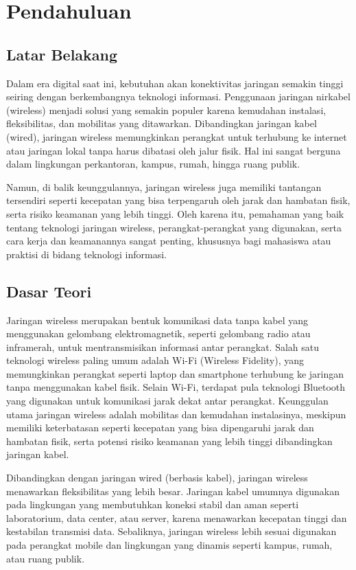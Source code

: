 \section{Pendahuluan}
\subsection{Latar Belakang}
Dalam era digital saat ini, kebutuhan akan konektivitas jaringan semakin tinggi seiring dengan berkembangnya teknologi informasi. Penggunaan jaringan nirkabel (wireless) menjadi solusi yang semakin populer karena kemudahan instalasi, fleksibilitas, dan mobilitas yang ditawarkan. Dibandingkan jaringan kabel (wired), jaringan wireless memungkinkan perangkat untuk terhubung ke internet atau jaringan lokal tanpa harus dibatasi oleh jalur fisik. Hal ini sangat berguna dalam lingkungan perkantoran, kampus, rumah, hingga ruang publik.

Namun, di balik keunggulannya, jaringan wireless juga memiliki tantangan tersendiri seperti kecepatan yang bisa terpengaruh oleh jarak dan hambatan fisik, serta risiko keamanan yang lebih tinggi. Oleh karena itu, pemahaman yang baik tentang teknologi jaringan wireless, perangkat-perangkat yang digunakan, serta cara kerja dan keamanannya sangat penting, khususnya bagi mahasiswa atau praktisi di bidang teknologi informasi.

\subsection{Dasar Teori}
Jaringan wireless merupakan bentuk komunikasi data tanpa kabel yang menggunakan gelombang elektromagnetik, seperti gelombang radio atau inframerah, untuk mentransmisikan informasi antar perangkat. Salah satu teknologi wireless paling umum adalah Wi-Fi (Wireless Fidelity), yang memungkinkan perangkat seperti laptop dan smartphone terhubung ke jaringan tanpa menggunakan kabel fisik. Selain Wi-Fi, terdapat pula teknologi Bluetooth yang digunakan untuk komunikasi jarak dekat antar perangkat. Keunggulan utama jaringan wireless adalah mobilitas dan kemudahan instalasinya, meskipun memiliki keterbatasan seperti kecepatan yang bisa dipengaruhi jarak dan hambatan fisik, serta potensi risiko keamanan yang lebih tinggi dibandingkan jaringan kabel.

Dibandingkan dengan jaringan wired (berbasis kabel), jaringan wireless menawarkan fleksibilitas yang lebih besar. Jaringan kabel umumnya digunakan pada lingkungan yang membutuhkan koneksi stabil dan aman seperti laboratorium, data center, atau server, karena menawarkan kecepatan tinggi dan kestabilan transmisi data. Sebaliknya, jaringan wireless lebih sesuai digunakan pada perangkat mobile dan lingkungan yang dinamis seperti kampus, rumah, atau ruang publik.


